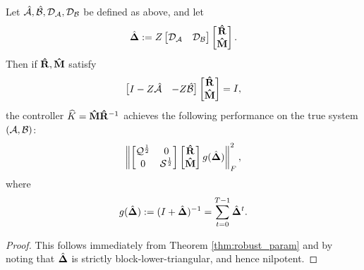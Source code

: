 \documentclass[11pt]{article}
\numberwithin{equation}{section}
\begin{document}
\begin{lemma}
Let $\hat{\mathcal{A}},\hat{\mathcal{B}},\mathcal{D}_{\mathcal{A}},\mathcal{D}_{\mathcal{B}}$ be defined as above, and let
\begin{equation}
\hat{\mathbf{\Delta}} := Z \begin{bmatrix} \mathcal{D}_{\mathcal{A}} & \mathcal{D}_{\mathcal{B}} \end{bmatrix} \begin{bmatrix} \mathbf{\hat{R}} \\ \mathbf{\hat{M}} \end{bmatrix}.
\end{equation}
Then if $\mathbf{\hat{R}},\mathbf{\hat{M}}$ satisfy 
\begin{equation}
\begin{bmatrix} I - Z\hat{\mathcal{A}} & -Z\hat{\mathcal{B}} \end{bmatrix}\begin{bmatrix} \mathbf{\mathbf{\hat{R}}} \\ \mathbf{\mathbf{\hat{M}}} \end{bmatrix} = I,
\end{equation}
the controller $\widehat{K} = \mathbf{\hat{M}}\mathbf{\hat{R}}^{-1}$ achieves the following performance on the true system $(\mathcal{A},\mathcal{B})$:
\begin{equation}
 \left\lVert \begin{bmatrix} \mathcal{Q}^{\frac{1}{2}} & 0 \\ 0 & \mathcal{S}^{\frac{1}{2}}\end{bmatrix}\begin{bmatrix}\mathbf{\mathbf{\hat{R}}} \\ \mathbf{\mathbf{\hat{M}}}\end{bmatrix}g(\hat{\mathbf{\Delta}}) \right\rVert_F^2,
 \label{eq:robust_cost}
 \end{equation}
 where 
\begin{equation}
g(\hat{\mathbf{\Delta}}) := (I + \hat{\mathbf{\Delta}})^{-1} = \sum_{t=0}^{T-1} \hat{\mathbf{\Delta}}^t.
\end{equation}
\label{lem:robust_stab}
\end{lemma}
\begin{proof}
This follows immediately from Theorem \ref{thm:robust_param} and by noting that $\hat{\mathbf{\Delta}}$ is strictly block-lower-triangular, and hence nilpotent.
\end{proof}
\end{document}
